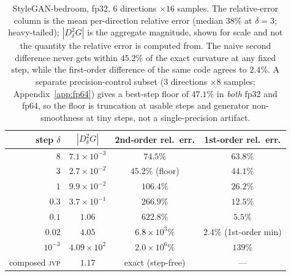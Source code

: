 \documentclass[10pt]{article} %
\newcommand{\jvp}{\textsc{jvp}}
\begin{document}
\begin{table}[h]\centering
\begin{tabular}{rccc}
\toprule
step $\delta$ & $|D^2_\delta G|$ & 2nd-order rel.\ err. & 1st-order rel.\ err. \\
\midrule
$8$ & $7.1\times10^{-3}$ & $74.5\%$ & $63.8\%$ \\
$3$ & $2.7\times10^{-2}$ & $45.2\%$ (floor) & $44.1\%$ \\
$1$ & $9.9\times10^{-2}$ & $106.4\%$ & $26.2\%$ \\
$0.3$ & $3.7\times10^{-1}$ & $266.9\%$ & $12.5\%$ \\
$0.1$ & $1.06$ & $622.8\%$ & $5.5\%$ \\
$0.02$ & $4.05$ & $6.8\times10^{3}\%$ & $2.4\%$ (1st-order min) \\
$10^{-3}$ & $4.09\times10^{2}$ & $2.0\times10^{6}\%$ & $139\%$ \\
\midrule
composed \jvp & $1.17$ & exact (step-free) & --- \\
\bottomrule
\end{tabular}
\caption{StyleGAN-bedroom, fp32, $6$ directions $\times16$ samples. The
relative-error column is the mean per-direction relative error (median $38\%$ at
$\delta=3$; heavy-tailed); $|D^2_\delta G|$ is the aggregate magnitude, shown for
scale and not the quantity the relative error is computed from. The naive second
difference never gets within $45.2\%$ of the exact curvature at any fixed step,
while the first-order difference of the same code agrees to $2.4\%$. A separate
precision-control subset ($3$ directions $\times8$ samples; Appendix~\ref{app:fp64})
gives a best-step floor of $47.1\%$ in \emph{both} fp32 and fp64, so the floor is
truncation at usable steps and generator non-smoothness at tiny steps, not a
single-precision artifact.}
\label{tab:stylegan}
\end{table}
\end{document}
